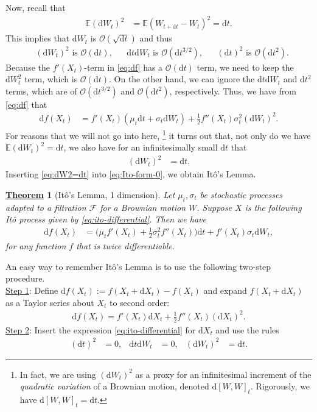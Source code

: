 \documentclass[12pt]{book}
\numberwithin{equation}{chapter}
\theoremstyle{plain}
\newtheorem{theorem}{\underline{Theorem}}
\numberwithin{theorem}{section}
\theoremstyle{definition}
\numberwithin{exercise}{chapter}
\newcommand{\<}{\langle}
\renewcommand{\>}{\rangle}
\renewcommand{\(}{\left(}
\renewcommand{\)}{\right)}
\renewcommand{\[}{\left[}
\renewcommand{\]}{\right]}
\newcommand\Eb{\mathds{E}}
\newcommand\Fc{\mathscr{F}}
\newcommand\Oc{\mathscr{O}}
\newcommand\sig{\sigma}
\newcommand\dd{\mathrm{d}}
\theoremstyle{definition}
\numberwithin{question}{section}
\begin{document}
Now, recall that
\begin{align}
\Eb  (\dd W_t )^2
	&=	\Eb (W_{t + \dd t} - W_t )^2
	 =	\dd t .
\end{align}
This implies that $\dd W_t$ is $\Oc(\sqrt{\dd t})$ and thus 
\begin{align}
&\text{$(\dd W_t)^2$ is $\Oc(\dd t)$}, &
&\text{$\dd t\dd W_t$ is $\Oc(\dd t^{3/2})$}, &
&\text{$(\dd t)^2$ is $\Oc(\dd t^2)$}.
\end{align}
Because the $f'(X_t)$-term in \eqref{eq:df} has a $\Oc(\dd t)$ term, we need to keep the $\dd W_t^2$ term, which is $\Oc(\dd t)$.  
On the other hand, we can ignore the $\dd t \dd W_t$ and $\dd t^2$ terms, which are of $\Oc(\dd t^{3/2})$ and $\Oc(\dd t^2)$, respectively.
Thus, we have from \eqref{eq:df} that
\begin{align}
\dd f(X_t)
	&= f'(X_t) ( \mu_t \dd t + \sig_t \dd W_t ) + \tfrac{1}{2} f''(X_t) \sig_t^2 (\dd W_t)^2 . \label{eq:Ito-form-0}
\end{align}
For reasons that we will not go into here,
\footnote{In fact, we are using $(\dd W_t)^2$ as a proxy for an infinitesimal increment of the \textit{quadratic variation} of a Brownian motion, denoted $\dd[W,W]_t$.  Rigorously, we have $\dd [W,W]_t = \dd t$.}
it turns out that, not only do we have $\Eb (\dd W_t )^2 = \dd t$, we also have for an infinitesimally small $\dd t$ that
\begin{align}
(\dd W_t)^2
	&= \dd t. \label{eq:dW2=dt}
\end{align}
Inserting \eqref{eq:dW2=dt} into \eqref{eq:Ito-form-0}, we obtain It\^o's Lemma.


\begin{theorem}[It\^{o}'s Lemma, 1 dimension]
Let $\mu_t, \sigma_t$ be stochastic processes adapted to a filtration $\Fc$ for a Brownian motion $W$. Suppose $X$ is the following It\^o process given by \eqref{eq:ito-differential}.  Then we have
\begin{align}
\dd f(X_t) 
	&= \big( \mu_t f'(X_t) + \frac{1}{2} \sigma_t^2 f''(X_t) \big) \dd t + f'(X_t) \sigma_t \dd W_t , \label{eq:ito-1d}
\end{align}
for any function $f$ that is twice differentiable.
\end{theorem}

\noindent
An easy way to remember It\^o's Lemma is to use the following two-step procedure.
\\[0.5em]	
\underline{Step 1}: Define $\dd f(X_t) := f(X_t + \dd X_t) - f(X_t)$ and expand $f(X_t + \dd X_t)$ as a Taylor series about $X_t$ to second order:
\begin{align}
\dd f(X_t) = f'(X_t) \dd X_t + \frac{1}{2} f''(X_t) (\dd X_t)^2 . \label{eq:taylor}
\end{align}
\underline{Step 2}: Insert the expression \eqref{eq:ito-differential} for $\dd X_t$ and use the rules 
\begin{align}
(\dd t)^2 &= 0, &
\dd t \dd W_t &= 0, &
(\dd W_t)^2 &= \dd t. \label{eq:rules}
\end{align}
\end{document}

